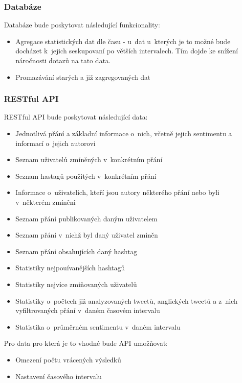 \documentclass[thesis=B,czech]{FITthesis}[2012/06/26]
\begin{document}
\subsubsection{Databáze}
 Databáze bude poskytovat následující funkcionality:
\begin{itemize}
\item Agregace statistických dat dle času - u~dat u~kterých je to možné bude docházet k~jejich seskupovaní po větších intervalech. Tím dojde ke snížení náročnosti dotazů na tato data. 
\item Promazávání starých a již zagregovaných dat
\end{itemize}
\subsubsection{RESTful API}
RESTful API bude poskytovat následující data:

\begin{itemize}
\item Jednotlivá přání a základní informace o~nich, včetně jejich sentimentu a informací o~jejich autorovi
\item Seznam uživatelů zmíněných v~konkrétním přání
\item Seznam hastagů použitých v~konkrétním přání
\item Informace o~uživatelích, kteří jsou autory některého přání nebo byli v~některém zmíněni
\item Seznam přání publikovaných daným uživatelem
\item Seznam přání v~nichž byl daný uživatel zmíněn
\item Seznam přání obsahujících daný hashtag
\item Statistiky nejpouívanějších hashtagů
\item Statistiky nejvíce zmiňovaných uživatelů
\item Statistiky o~počtech již analyzovaných tweetů, anglických tweetů a z~nich vyfiltrovaných přání v~daném časovém intervalu
\item Statistika o~průměrném sentimentu v~daném intervalu
\end{itemize}

\noindent Pro data pro která je to vhodné bude API umožňovat:
\begin{itemize}
\item Omezení počtu vrácených výsledků
\item Nastavení časového intervalu
\end{itemize}
\end{document}
